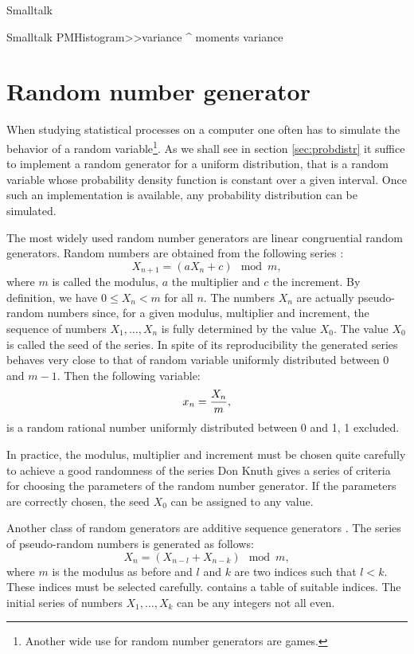 \begin{displaycode}{Smalltalk}
\begin{displaycode}{Smalltalk}
PMHistogram>>variance
    ^ moments variance
\end{displaycode}
  
\section{Random number generator}
\label{sec:random} When studying statistical processes on a
computer one often has to simulate the behavior of a random
variable\footnote{Another wide use for random number generators
are games.}. As we shall see in section \ref{sec:probdistr} it
suffice to implement a random generator for a uniform
distribution, that is a random variable whose probability density
function is constant over a given interval. Once such an
implementation is available, any probability distribution can be
simulated.

 The most widely
used random number generators are linear congruential random
generators. Random numbers are obtained from the following series
\cite{Knuth2}:
\begin{equation}
\label{eq:crg}
  X_{n+1} = \left(aX_n+c\right) \mod m,
\end{equation}
where $m$ is called the modulus, $a$ the multiplier and $c$ the
increment. By definition, we have $0\leq X_n<m$ for all $n$. The
numbers $X_n$ are actually pseudo-random numbers since, for a
given modulus, multiplier and increment, the sequence of numbers
$X_1,\ldots,X_n$ is fully determined by the value $X_0$. The value
$X_0$ is called the seed of the series. In spite of its
reproducibility the generated series behaves very close to that of
random variable uniformly distributed between 0 and $m-1$. Then
the following variable:
\begin{equation}
  x_n = {X_n \over m},
\end{equation}
is a random rational number uniformly distributed between 0 and 1,
1 excluded.

In practice, the modulus, multiplier and increment must be chosen
quite carefully to achieve a good randomness of the series
Don Knuth \cite{Knuth2} gives a series of criteria for choosing the
parameters of the random number generator.
If the parameters are correctly chosen, the seed $X_0$ can be assigned to any value.

 Another class of random
generators are additive sequence generators \cite{Knuth2}. The
series of pseudo-random numbers is generated as follows:
\begin{equation}
  X_n = \left(X_{n-l}+X_{n-k}\right) \mod m,
\end{equation}
where $m$ is the modulus as before and $l$ and $k$ are two indices
such that $l<k$.
These indices must be selected carefully.
\cite{Knuth2} contains a table of suitable indices. The initial
series of numbers $X_1,\ldots,X_k$ can be any integers not all
even.


\end{displaycode}

